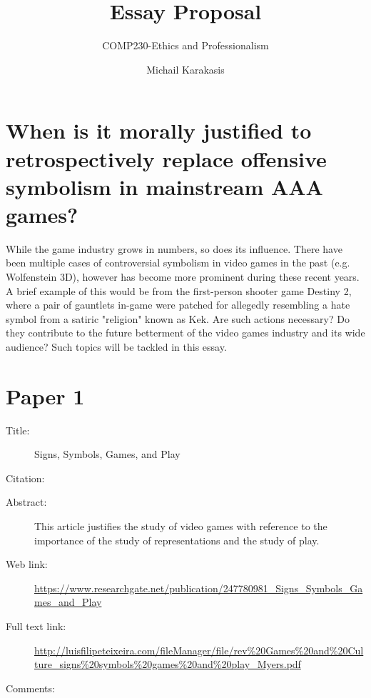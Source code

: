 \documentclass{scrartcl}
\title{Essay Proposal}
\subtitle{COMP230-Ethics and Professionalism}
\author{Michail Karakasis}
\begin{document}
\maketitle

\section*{When is it morally justified to retrospectively replace offensive symbolism in mainstream AAA games?}

While the game industry grows in numbers, so does its influence. There have been multiple cases of controversial symbolism in video games in the past (e.g. Wolfenstein 3D), however has become more prominent during these recent years. A brief example of this would be from the first-person shooter game Destiny 2, where a pair of gauntlets in-game were patched for allegedly resembling a hate symbol from a satiric "religion" known as Kek. Are such actions necessary? Do they contribute to the future betterment of the video games industry and its wide audience? Such topics will be tackled in this essay.

\section*{Paper 1}
\begin{description}
\item[Title:]Signs, Symbols, Games, and Play
\item[Citation:] \cite{davidmyers}
\item[Abstract:] This article justifies the study of video games with reference to the importance of the study of representations and the study of play.
\item[Web link:]\url{https://www.researchgate.net/publication/247780981_Signs_Symbols_Games_and_Play}
\item[Full text link:] \url{http://luisfilipeteixeira.com/fileManager/file/rev%20Games%20and%20Culture_signs%20symbols%20games%20and%20play_Myers.pdf}
\item[Comments:] 
\end{description}
\end{document}
